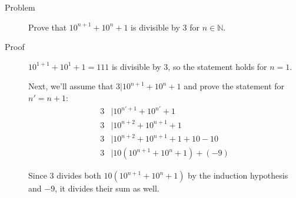 \begin{description}
\item[Problem] Prove that $10^{n+1} + 10^n + 1$ is divisible by 3 for $n \in
\mathbb{N}$.

\item[Proof] $10^{1 + 1} + 10^1 + 1 = 111$ is divisible by 3, so the statement
holds for $n = 1$.

Next, we'll assume that $3 | 10^{n+1} + 10^n + 1$ and prove the statement for
$n' = n + 1$:
\begin{equation*}\begin{aligned}
3 &| 10^{n'+1} + 10^{n'} + 1 \\
3 &| 10^{n+2} + 10^{n+1} + 1 \\
3 &| 10^{n+2} + 10^{n+1} + 1 + 10 - 10 \\
3 &| 10 \left(10^{n+1} + 10^n + 1\right) + (-9)
\end{aligned}\end{equation*}

Since 3 divides both $10 \left(10^{n+1} + 10^n + 1\right)$ by the induction
hypothesis and $-9$, it divides their sum as well.

\end{description}
